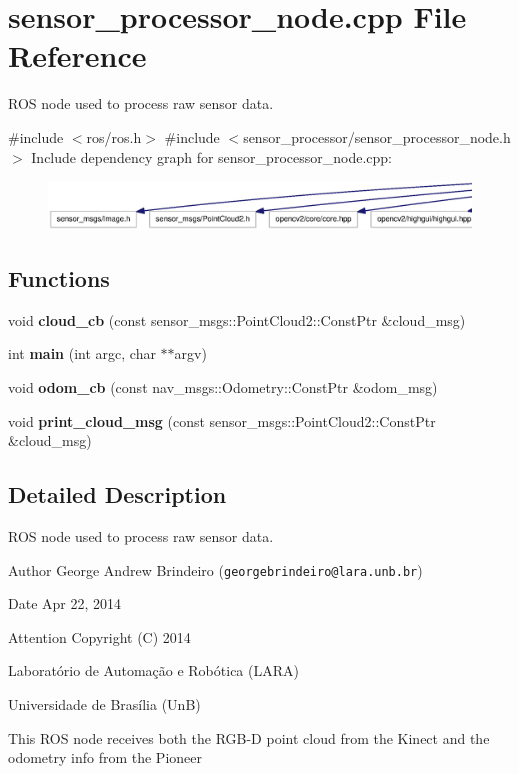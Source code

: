 \section{sensor\-\_\-processor\-\_\-node.\-cpp \-File \-Reference}
\label{sensor__processor__node_8cpp}


\-R\-O\-S node used to process raw sensor data.  


{\ttfamily \#include $<$ros/ros.\-h$>$}\*
{\ttfamily \#include $<$sensor\-\_\-processor/sensor\-\_\-processor\-\_\-node.\-h$>$}\*
\-Include dependency graph for sensor\-\_\-processor\-\_\-node.\-cpp\-:\nopagebreak
\begin{figure}[H]
\begin{center}
\leavevmode
\includegraphics[width=350pt]{sensor__processor__node_8cpp__incl}
\end{center}
\end{figure}
\subsection*{\-Functions}
\begin{DoxyCompactItemize}
\item 
void {\bf cloud\-\_\-cb} (const sensor\-\_\-msgs\-::\-Point\-Cloud2\-::\-Const\-Ptr \&cloud\-\_\-msg)
\item 
int {\bf main} (int argc, char $\ast$$\ast$argv)
\item 
void {\bf odom\-\_\-cb} (const nav\-\_\-msgs\-::\-Odometry\-::\-Const\-Ptr \&odom\-\_\-msg)
\item 
void {\bf print\-\_\-cloud\-\_\-msg} (const sensor\-\_\-msgs\-::\-Point\-Cloud2\-::\-Const\-Ptr \&cloud\-\_\-msg)
\end{DoxyCompactItemize}


\subsection{\-Detailed \-Description}
\-R\-O\-S node used to process raw sensor data. \begin{DoxyAuthor}{\-Author}
\-George \-Andrew \-Brindeiro ({\tt georgebrindeiro@lara.\-unb.\-br}) 
\end{DoxyAuthor}
\begin{DoxyDate}{\-Date}
\-Apr 22, 2014
\end{DoxyDate}
\begin{DoxyAttention}{\-Attention}
\-Copyright (\-C) 2014 

\-Laboratório de \-Automação e \-Robótica (\-L\-A\-R\-A) 

\-Universidade de \-Brasília (\-Un\-B)
\end{DoxyAttention}
\-This \-R\-O\-S node receives both the \-R\-G\-B-\/\-D point cloud from the \-Kinect and the odometry info from the \-Pioneer 

